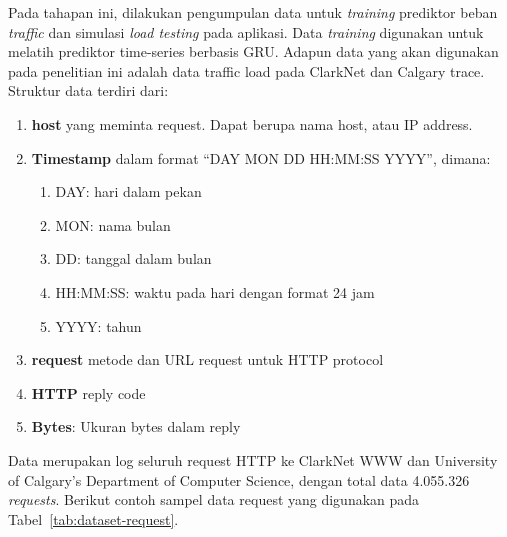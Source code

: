 Pada tahapan ini, dilakukan pengumpulan data untuk \emph{training} prediktor beban \emph{traffic} dan simulasi \emph{load testing} pada aplikasi. Data \emph{training} digunakan untuk melatih prediktor time-series berbasis GRU. Adapun data yang akan digunakan pada penelitian ini adalah data traffic load pada ClarkNet dan Calgary trace. Struktur data terdiri dari:

\begin{enumerate}
    \item \textbf{host} yang meminta request. Dapat berupa nama host, atau IP address.
    \item \textbf{Timestamp} dalam format ``DAY MON DD HH:MM:SS YYYY'', dimana:
    \begin{enumerate}
        \item DAY: hari dalam pekan
        \item MON: nama bulan
        \item DD: tanggal dalam bulan
        \item HH:MM:SS: waktu pada hari dengan format 24 jam
        \item YYYY: tahun
    \end{enumerate}
    \item \textbf{request} metode dan URL request untuk HTTP protocol
    \item \textbf{HTTP} reply code
    \item \textbf{Bytes}: Ukuran bytes dalam reply
\end{enumerate}

Data merupakan log seluruh request HTTP ke ClarkNet WWW dan University of Calgary's Department of Computer Science, dengan total data 4.055.326 \emph{requests}. Berikut contoh sampel data request yang digunakan pada Tabel~\ref{tab:dataset-request}.


